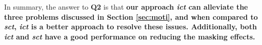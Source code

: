 \documentclass[10pt,journal,compsoc]{IEEEtran}
\begin{document}


In summary, the answer to \textbf{Q2} is that \textbf{our approach \emph{ict} can alleviate the three problems discussed in Section \ref{sec:moti}, and when compared to \emph{sct}, \emph{ict} is a better approach to resolve these issues. Additionally, both \emph{ict} and \emph{sct} have a good performance on reducing the masking effects.}
\end{document}
